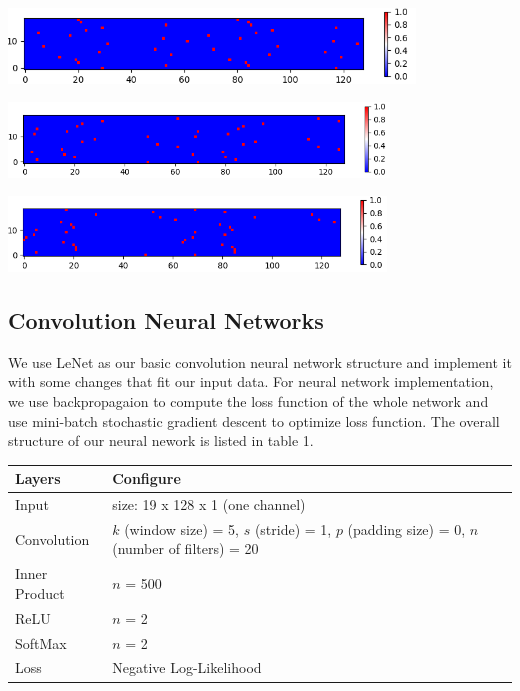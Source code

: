 \documentclass[letterpaper, 11pt]{article}
\newenvironment{Figure}
  {\par\medskip\noindent\minipage{\linewidth}}
  {\endminipage\par\medskip}
\begin{document}
\begin{multicols*}{2}
{\begin{Figure}
\end{Figure} 
\begin{Figure}
\includegraphics[height=2cm, width=\textwidth]{neg1.png}
\end{Figure} 
\begin{Figure}
\includegraphics[height=2cm, width=\textwidth]{neg2.png}
\end{Figure} 
\begin{Figure}
\includegraphics[height=2cm, width=\textwidth]{neg3.png}
\end{Figure} 
\subsection{Convolution Neural Networks}
We use LeNet as our basic convolution neural network structure and implement it with some changes that fit our input data. For neural network implementation, we use backpropagaion to compute the loss function of the whole network and use mini-batch stochastic gradient descent to optimize loss function. The overall structure of our neural nework is listed in table 1.
\begin{center}
\begin{tabular}{ || m{2cm} | m{5cm} ||}
\hline
\textbf{Layers} & \textbf{Configure} \\ 
\hline
Input & size: 19 x 128 x 1 (one channel) \\
\hline
Convolution & $k$ (window size) = 5, $s$ (stride) = 1, $p$ (padding size) = 0, $n$ (number of filters) = 20 \\
\hline
Inner Product & $n$ = 500 \\
\hline
ReLU & $n$ = 2\\
\hline
SoftMax  &  $n$ = 2\\
\hline 
Loss & Negative Log-Likelihood\\
\hline
\end{tabular}
\vspace{2mm}


\end{center}}
\end{multicols*}
\end{document}
